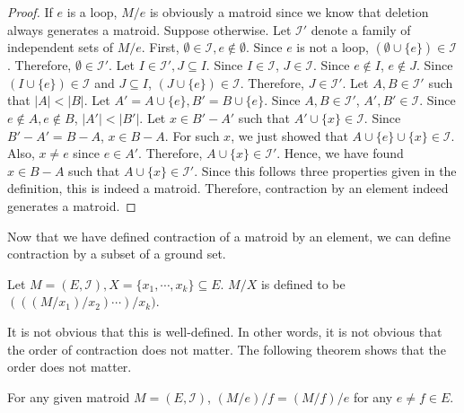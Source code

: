\begin{proof}
If $e$ is a loop, $M / e$ is obviously a matroid since we know that deletion always generates a matroid.
Suppose otherwise.
Let $\mathcal{I}'$ denote a family of independent sets of $M / e$.
First, $\emptyset \in \mathcal{I}, e \notin \emptyset$. Since $e$ is not a loop, $(\emptyset \cup \{ e \}) \in \mathcal{I}$.
Therefore, $\emptyset \in \mathcal{I}'$.
Let $I \in \mathcal{I}', J \subseteq I$.
Since $I \in \mathcal{I}$, $J \in \mathcal{I}$.
Since $e \notin I$, $e \notin J$.
Since $(I \cup \{ e \}) \in \mathcal{I}$ and $J \subseteq I$, $(J \cup \{ e \}) \in \mathcal{I}$.
Therefore, $J \in \mathcal{I}'$.
Let $A, B \in \mathcal{I}'$ such that $\lvert A \rvert < \lvert B \rvert$.
Let $A' = A \cup \{ e \}, B' = B \cup \{ e \}$.
Since $A, B \in \mathcal{I}'$, $A', B' \in \mathcal{I}$.
Since $e \notin A, e \notin B$, $\lvert A' \rvert < \lvert B' \rvert$.
Let $x \in B' - A'$ such that $A' \cup \{ x \} \in \mathcal{I}$.
Since $B' - A' = B - A$, $x \in B - A$.
For such $x$, we just showed that $A \cup \{ e \} \cup \{ x \} \in \mathcal{I}$.
Also, $x \neq e$ since $e \in A'$.
Therefore, $A \cup \{ x \} \in \mathcal{I}'$. 
Hence, we have found $x \in B - A$ such that $A \cup \{ x \} \in \mathcal{I}'$.
Since this follows three properties given in the definition, this is indeed a matroid.
Therefore, contraction by an element indeed generates a matroid.
\end{proof}


Now that we have defined contraction of a matroid by an element, we can define contraction by a subset of a ground set.
\begin{defn}
Let $M = (E, \mathcal{I}), X = \{ x_1, \cdots, x_k \} \subseteq E$.
$M / X$ is defined to be $(((M/x_1)/x_2) \cdots)/x_k)$.
\end{defn}

It is not obvious that this is well-defined. 
In other words, it is not obvious that the order of contraction does not matter.
The following theorem shows that the order does not matter.

\begin{thm}
For any given matroid $M = (E, \mathcal{I})$,
$(M / e) / f = (M / f) / e$ for any $e \neq f \in E$.
\end{thm}

